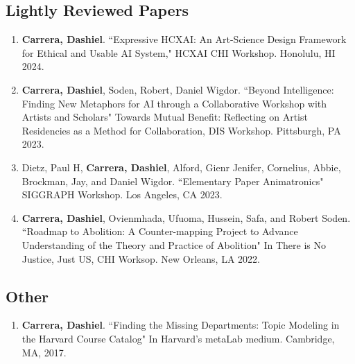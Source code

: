 \subsection{Lightly Reviewed Papers}
\begin{enumerate}
 \item \textbf{Carrera, Dashiel}. ``Expressive HCXAI: An Art-Science Design Framework for Ethical and Usable AI System," HCXAI CHI Workshop. Honolulu, HI 2024. \\
  \item \textbf{Carrera, Dashiel}, Soden, Robert, Daniel Wigdor. ``Beyond Intelligence: Finding New Metaphors for AI through a Collaborative Workshop with Artists and Scholars" Towards Mutual Benefit: Reflecting on Artist Residencies as a Method for Collaboration, DIS Workshop. Pittsburgh, PA 2023. \\
   \item  Dietz, Paul H, \textbf{Carrera, Dashiel}, Alford, Gienr Jenifer, Cornelius, Abbie, Brockman, Jay, and Daniel Wigdor. ``Elementary Paper Animatronics" SIGGRAPH Workshop. Los Angeles, CA 2023. \\
  \item \textbf{Carrera, Dashiel}, Ovienmhada, Ufuoma, Hussein, Safa, and Robert Soden. ``Roadmap to Abolition: A Counter-mapping Project to Advance Understanding of the Theory and Practice of Abolition" In There is No Justice, Just US, CHI Worksop. New Orleans, LA 2022. 
  \end{enumerate}
  
\subsection{Other}
\begin{enumerate}
\item \textbf{Carrera, Dashiel}. ``Finding the Missing Departments: Topic Modeling in the Harvard Course Catalog" In Harvard's metaLab medium. Cambridge, MA, 2017.\\
\end{enumerate} 



